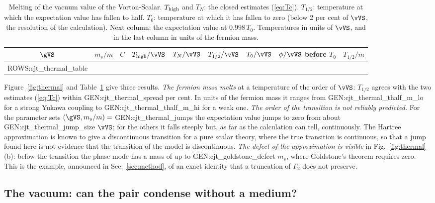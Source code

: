 \begin{table}
\caption{\label{tab:thermal}Melting of the vacuum value of the Vorton-Scalar. $T_{\rm high}$ and
$T_N$: the closed estimates (\ref{eq:Tc}). $T_{1/2}$: temperature at which the expectation value has
fallen to half. $T_0$: temperature at which it has fallen to zero (below 2 per cent of $\vVS$, the
resolution of the calculation). Next column: the expectation value at $0.998\,T_0$. Temperatures in
units of $\vVS$, and in the last column in units of the fermion mass.}
\begin{ruledtabular}
\begin{tabular}{ccccccccc}
$\gVS$ & $m_s/m$ & $C$ & $T_{\rm high}/\vVS$ & $T_{N}/\vVS$ & $T_{1/2}/\vVS$ & $T_0/\vVS$ & $\phi/\vVS$ before $T_0$ & $T_{1/2}/m$ \\
\hline
{{ROWS:cjt_thermal_table}}
\end{tabular}
\end{ruledtabular}
\end{table}

Figure~\ref{fig:thermal} and Table~\ref{tab:thermal} give three results. \emph{The fermion mass
melts} at a temperature of the order of $\vVS$: $T_{1/2}$ agrees with the two estimates
(\ref{eq:Tc}) within {{GEN:cjt_thermal_spread}} per cent. In units of the fermion mass it ranges from
{{GEN:cjt_thermal_thalf_m_lo}} for a strong Yukawa coupling to {{GEN:cjt_thermal_thalf_m_hi}} for a
weak one. \emph{The order of the transition is not
reliably predicted.} For the parameter sets $(\gVS,m_s/m)=$ {{GEN:cjt_thermal_jumps}} the expectation
value jumps to zero from about {{GEN:cjt_thermal_jump_size}} $\vVS$; for the others it falls steeply
but, as far as the calculation can tell, continuously. The Hartree approximation is known to give a
discontinuous transition for a pure scalar theory, where the true transition is continuous, so that a
jump found here is not evidence that the transition of the model is discontinuous. \emph{The defect
of the approximation is visible} in Fig.~\ref{fig:thermal}(b): below the transition the phase mode
has a mass of up to {{GEN:cjt_goldstone_defect}} $m_s$, where Goldstone's theorem requires zero. This
is the example, announced in Sec.~\ref{sec:method}, of an exact identity that a truncation of
$\Gamma_2$ does not preserve.

\subsection{The vacuum: can the pair condense without a medium?}
\label{sec:vacuum}

